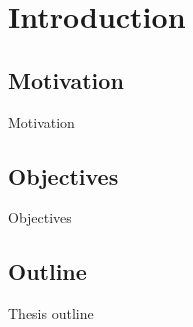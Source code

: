 \chapter{Introduction}
	\section{Motivation}
	
	Motivation
			
		
	\section{Objectives}
		Objectives
	
		
	\section{Outline}
		Thesis outline

				